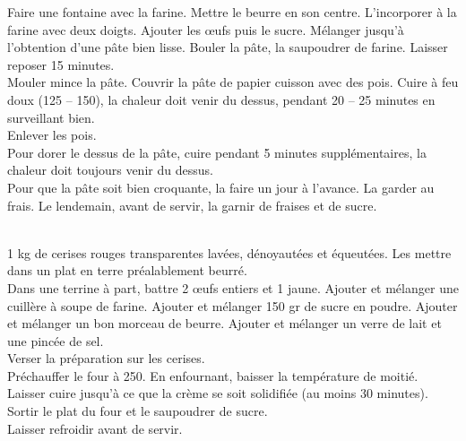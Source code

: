 \begin{minipage}[c]{\textwidth}
Faire une fontaine avec la farine. Mettre le beurre en son centre. L’incorporer à la farine avec deux doigts. Ajouter les œufs puis le sucre. Mélanger jusqu’à l’obtention d’une pâte bien lisse. Bouler la pâte, la saupoudrer de farine. Laisser reposer 15 minutes. \\
Mouler mince la pâte. Couvrir la pâte de papier cuisson avec des pois. Cuire à feu doux (125 – 150\degrees), la chaleur doit venir du dessus, pendant 20 – 25 minutes en surveillant bien. \\
Enlever les pois. \\
Pour dorer le dessus de la pâte, cuire pendant 5 minutes supplémentaires, la chaleur doit toujours venir du dessus.\\
Pour que la pâte soit bien croquante, la faire un jour à l’avance. La garder au frais. Le lendemain, avant de servir, la garnir de fraises et de sucre.\\
\\

\end{minipage}

\begin{minipage}[c]{\textwidth}
1 kg de cerises rouges transparentes lavées, dénoyautées et équeutées. Les mettre dans un plat en terre préalablement beurré. \\
Dans une terrine à part, battre 2 œufs entiers et 1 jaune. Ajouter et mélanger une cuillère à soupe de farine. Ajouter et mélanger 150 gr de sucre en poudre. Ajouter et mélanger un bon morceau de beurre. Ajouter et mélanger un verre de lait et une pincée de sel. \\
Verser la préparation sur les cerises. \\
Préchauffer le four à 250\degrees. En enfournant, baisser la température de moitié. Laisser cuire jusqu’à ce que la crème se soit solidifiée (au moins 30 minutes).  \\
Sortir le plat du four et le saupoudrer de sucre.\\
Laisser refroidir avant de servir.\\
\\

\end{minipage}

